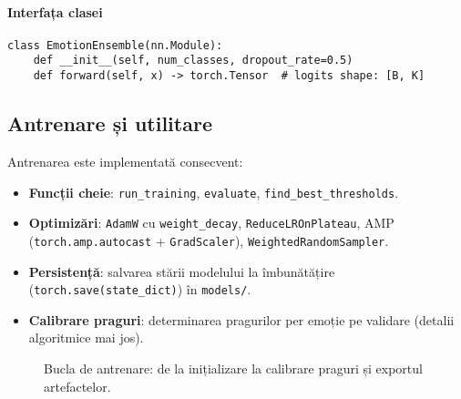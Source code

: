 \paragraph{Interfața clasei}
\begin{verbatim}
class EmotionEnsemble(nn.Module):
    def __init__(self, num_classes, dropout_rate=0.5)
    def forward(self, x) -> torch.Tensor  # logits shape: [B, K]
\end{verbatim}

\subsection{Antrenare și utilitare}
Antrenarea este implementată consecvent:
\begin{itemize}
  \item \textbf{Funcții cheie}: \texttt{run\_training}, \texttt{evaluate}, \texttt{find\_best\_thresholds}.
  \item \textbf{Optimizări}: \texttt{AdamW} cu \texttt{weight\_decay}, \texttt{ReduceLROnPlateau}, AMP (\texttt{torch.amp.autocast} + \texttt{GradScaler}), \texttt{WeightedRandomSampler}.
  \item \textbf{Persistență}: salvarea stării modelului la îmbunătățire (\texttt{torch.save(state\_dict)}) în \texttt{models/}.
  \item \textbf{Calibrare praguri}: determinarea pragurilor per emoție pe validare (detalii algoritmice mai jos).
\end{itemize}

\begin{figure}[!htbp]
  \centering
  \caption{Bucla de antrenare: de la inițializare la calibrare praguri și exportul artefactelor.}
  \label{fig:c5-train-loop}
\end{figure}

